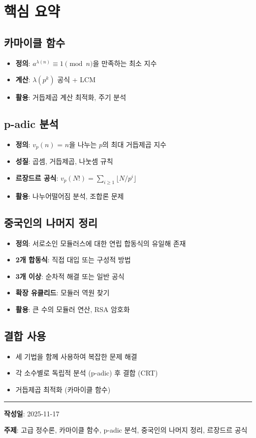 \documentclass[11pt,a4paper]{article}
\theoremstyle{definition}
\theoremstyle{remark}
\begin{document}
\newpage

\section{핵심 요약}

\subsection{카마이클 함수}

\begin{itemize}
    \item \textbf{정의}: $a^{\lambda(n)} \equiv 1 \pmod{n}$을 만족하는 최소 지수
    \item \textbf{계산}: $\lambda(p^k)$ 공식 + LCM
    \item \textbf{활용}: 거듭제곱 계산 최적화, 주기 분석
\end{itemize}

\subsection{p-adic 분석}

\begin{itemize}
    \item \textbf{정의}: $v_p(n)$ = $n$을 나누는 $p$의 최대 거듭제곱 지수
    \item \textbf{성질}: 곱셈, 거듭제곱, 나눗셈 규칙
    \item \textbf{르장드르 공식}: $v_p(N!) = \sum_{i \geq 1} \lfloor N/p^i \rfloor$
    \item \textbf{활용}: 나누어떨어짐 분석, 조합론 문제
\end{itemize}

\subsection{중국인의 나머지 정리}

\begin{itemize}
    \item \textbf{정의}: 서로소인 모듈러스에 대한 연립 합동식의 유일해 존재
    \item \textbf{2개 합동식}: 직접 대입 또는 구성적 방법
    \item \textbf{3개 이상}: 순차적 해결 또는 일반 공식
    \item \textbf{확장 유클리드}: 모듈러 역원 찾기
    \item \textbf{활용}: 큰 수의 모듈러 연산, RSA 암호화
\end{itemize}

\subsection{결합 사용}

\begin{itemize}
    \item 세 기법을 함께 사용하여 복잡한 문제 해결
    \item 각 소수별로 독립적 분석 (p-adic) 후 결합 (CRT)
    \item 거듭제곱 최적화 (카마이클 함수)
\end{itemize}

\vspace{1cm}

\hrule

\vspace{0.5cm}

\textbf{작성일}: 2025-11-17

\textbf{주제}: 고급 정수론, 카마이클 함수, p-adic 분석, 중국인의 나머지 정리, 르장드르 공식
\end{document}
